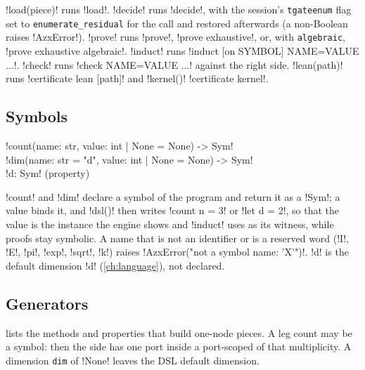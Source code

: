 \py!load(piece)! runs \azx!load!. \py!decide! runs \azx!decide!, with the session's \texttt{tgateenum} flag set to \texttt{enumerate\_residual} for the call and restored afterwards (a non-Boolean raises \py!AzxError!). \py!prove! runs \azx!prove!, \azx!prove exhaustive!, or, with \texttt{algebraic}, \azx!prove exhaustive algebraic!. \py!induct! runs \code!induct [on SYMBOL] NAME=VALUE ...!. \py!check! runs \code!check NAME=VALUE ...! against the right side. \py!lean(path)! runs \azx!certificate lean [path]! and \py!kernel()! \azx!certificate kernel!.

\subsection{Symbols}

\begin{signature}
\py!count(name: str, value: int | None = None) -> Sym!\\
\code!dim(name: str = "d", value: int | None = None) -> Sym!\\
\py!d: Sym! (property)
\end{signature}
\py!count! and \py!dim! declare a symbol of the program and return it as a \py!Sym!; a value binds it, and \py!dsl()! then writes \code!count n = 3! or \code!let d = 2!, so that the value is the instance the engine shows and \azx!induct! uses as its witness, while proofs stay symbolic. A name that is not an identifier or is a reserved word (\code!I!, \code!E!, \code!pi!, \code!exp!, \code!sqrt!, \code!k!) raises \code!AzxError("not a symbol name: 'X'")!. \py!d! is the default dimension \code!d! (\cref{ch:language}), not declared.

\subsection{Generators}

 lists the methods and properties that build one-node pieces. A leg count may be a symbol: then the side has one port inside a port-scoped \bbox{} of that multiplicity. A dimension \texttt{dim} of \py!None! leaves the DSL default dimension.

